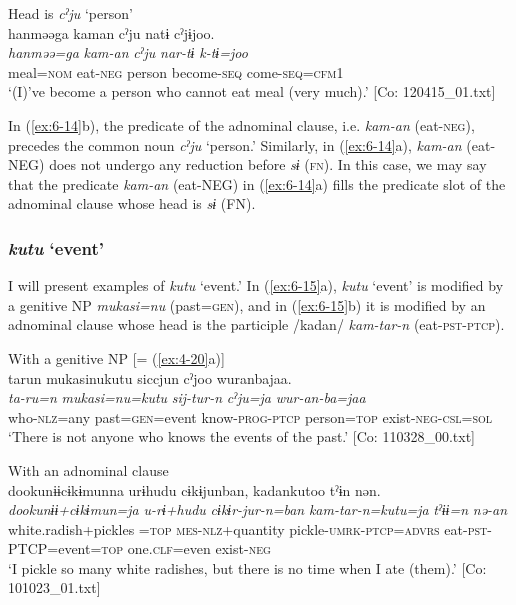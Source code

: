 \ex Head is \textit{cˀju} ‘person’\\
{\TM}
\glll  hanməəga  kaman  cˀju  natɨ  cˀjɨjoo.\\
\textit{hanməə=ga}  \textit{kam-an}  \textit{cˀju}  \textit{nar-tɨ}  \textit{k-tɨ=joo}\\
meal=\textsc{nom}  eat-\textsc{neg}  person  become-\textsc{seq}  come-\textsc{seq}=\textsc{cfm}1\\
\glt ‘(I)’ve become a person who cannot eat meal (very much).’ [Co: 120415\_01.txt]
\z
\z

In (\ref{ex:6-14}b), the predicate of the adnominal clause, i.e. \textit{kam-an} (eat-\textsc{neg}), precedes the common noun \textit{cˀju} ‘person.’ Similarly, in (\ref{ex:6-14}a), \textit{kam-an} (eat-NEG) does not undergo any reduction before \textit{sɨ} (\textsc{fn}). In this case, we may say that the predicate \textit{kam-an} (eat-NEG) in (\ref{ex:6-14}a) fills the predicate slot of the adnominal clause whose head is \textit{sɨ} (FN).

\subsubsection{\textit{kutu} ‘event’}

I will present examples of \textit{kutu} ‘event.’ In (\ref{ex:6-15}a), \textit{kutu} ‘event’ is modified by a genitive NP \textit{mukasi=nu} (past=\textsc{gen}), and in (\ref{ex:6-15}b) it is modified by an adnominal clause whose head is the participle /kadan/ \textit{kam-tar-n} (eat-\textsc{pst}-\textsc{ptcp}).

\ea\label{ex:6-15}
\ea With a genitive NP [= (\ref{ex:4-20}a)]\\
{\TM}
\glll  tarun  mukasinukutu  siccjun  cˀjoo  wuranbajaa.\\
\textit{ta-ru=n}  \textit{mukasi=nu=kutu}  \textit{sij-tur-n} \textit{cˀju=ja}  \textit{wur-an-ba=jaa}\\
who-\textsc{nlz}=any  past=\textsc{gen}=event  know-\textsc{prog}-\textsc{ptcp}   person=\textsc{top}  exist-\textsc{neg}-\textsc{csl}=\textsc{sol}\\
\glt ‘There is not anyone who knows the events of the past.’ [Co: 110328\_00.txt]
\z

\ex With an adnominal clause\\
{\TM}
\glll  dookunɨɨcɨkɨmunna  urɨhudu  cɨkɨjunban,  kadankutoo  tˀɨn   nən.\\
\textit{dookunɨɨ+cɨkɨmun=ja}  \textit{u-rɨ+hudu}   \textit{cɨkɨr-jur-n=ban}  \textit{kam-tar-n=kutu=ja}  \textit{tˀɨɨ=n}  \textit{nə-an}\\
white.radish+pickles =\textsc{top}  \textsc{mes}-\textsc{nlz}+quantity  pickle-\textsc{umrk}-\textsc{ptcp}=\textsc{advrs}  eat-\textsc{pst}-PTCP=event=\textsc{top}  one.\textsc{clf}=even   exist-\textsc{neg}\\
\glt ‘I pickle so many white radishes, but there is no time when I ate (them).’ [Co: 101023\_01.txt]
\z

